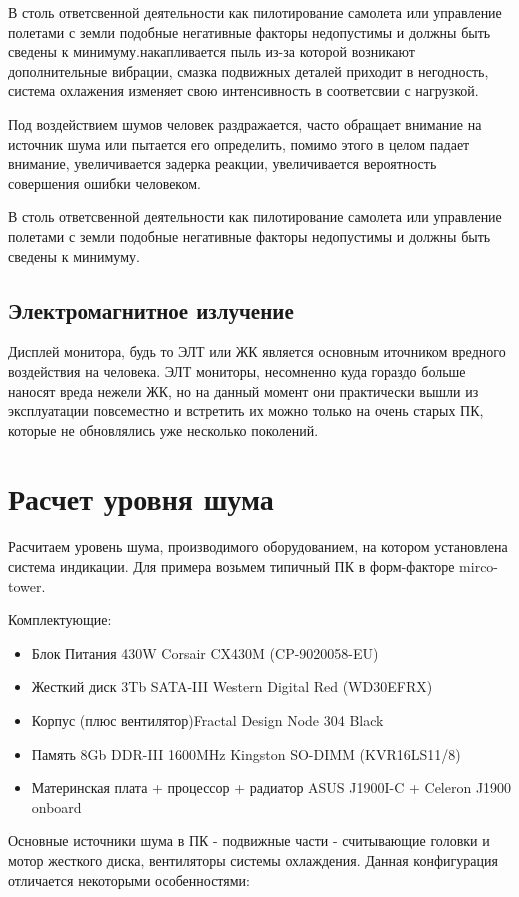 \documentclass[a4paper,12pt]{report} %
\begin{document}
В столь ответсвенной деятельности как пилотирование самолета или управление
полетами с земли подобные негативные факторы недопустимы и должны быть сведены к
минимуму.накапливается пыль из-за которой возникают дополнительные вибрации,
смазка подвижных деталей приходит в негодность, система охлажения изменяет свою
интенсивность в соответсвии с нагрузкой.

Под воздействием шумов человек раздражается, часто обращает внимание на источник
шума или пытается его определить, помимо этого в целом падает внимание,
увеличивается задерка реакции, увеличивается вероятность совершения ошибки
человеком.

В столь ответсвенной деятельности как пилотирование самолета или управление
полетами с земли подобные негативные факторы недопустимы и должны быть сведены к
минимуму.
\subsection{Электромагнитное излучение}
Дисплей монитора, будь то ЭЛТ или ЖК является основным иточником вредного
воздействия на человека. ЭЛТ мониторы, несомненно куда гораздо больше наносят
вреда нежели ЖК, но на данный момент они практически вышли из эксплуатации
повсеместно и встретить их можно только на очень старых ПК, которые не
обновлялись уже несколько поколений.

\section{Расчет уровня шума}
Расчитаем уровень шума, производимого оборудованием, на котором установлена
система индикации. Для примера возьмем типичный ПК в форм-факторе mirco-tower.

Комплектующие:
\begin{itemize}
\item{Блок Питания} 430W Corsair CX430M (CP-9020058-EU)
\item{Жесткий диск} 3Tb SATA-III Western Digital Red (WD30EFRX)	
\item{Корпус (плюс вентилятор)}Fractal Design Node 304 Black
\item{Память} 8Gb DDR-III 1600MHz Kingston SO-DIMM (KVR16LS11/8)
\item{Материнская плата + процессор + радиатор} ASUS J1900I-C + Celeron J1900 onboard
\end{itemize}

Основные источники шума в ПК - подвижные части - считывающие головки и мотор
жесткого диска, вентиляторы системы охлаждения. Данная конфигурация отличается
некоторыми особенностями:
\end{document}
